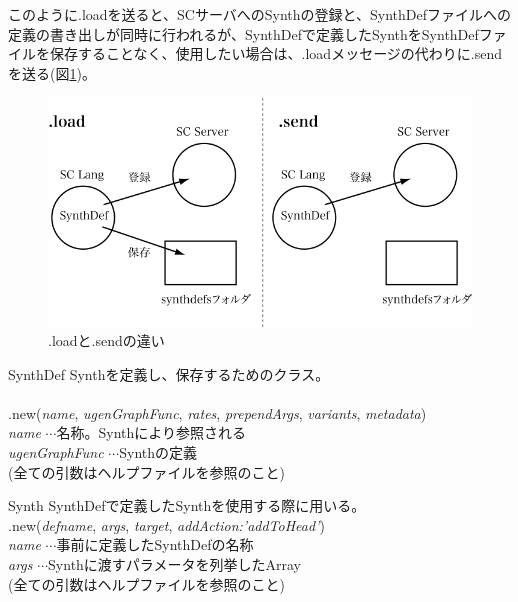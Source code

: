 \documentclass{jsarticle}
\begin{document}
このように.loadを送ると、SCサーバへのSynthの登録と、SynthDefファイルへの定義の書き出しが同時に行われるが、SynthDefで定義したSynthをSynthDefファイルを保存することなく、使用したい場合は、.loadメッセージの代わりに.sendを送る(図\ref{fig:load_send})。

\begin{figure}[htbp]
 \begin{center}
  \includegraphics[scale=0.7]{SynthDef.pdf}
 \end{center}
 \caption{.loadと.sendの違い}
 \label{fig:load_send}
\end{figure}


\begin{itembox}[l]{SynthDef}
{\footnotesize 
Synthを定義し、保存するためのクラス。\\\\
.new({\it name}, {\it ugenGraphFunc}, {\it rates}, {\it prependArgs}, {\it variants}, {\it metadata})\\

{\it name} $\cdots$名称。Synthにより参照される\\
{\it ugenGraphFunc} $\cdots$Synthの定義\\
(全ての引数はヘルプファイルを参照のこと)
}
\end{itembox}

\begin{itembox}[l]{Synth}
{\footnotesize 
SynthDefで定義したSynthを使用する際に用いる。\\
.new({\it defname}, {\it args}, {\it target}, {\it addAction:'addToHead'})\\

{\it name} $\cdots$事前に定義したSynthDefの名称\\
{\it args} $\cdots$Synthに渡すパラメータを列挙したArray\\
(全ての引数はヘルプファイルを参照のこと)
}
\end{itembox}
\end{document}
